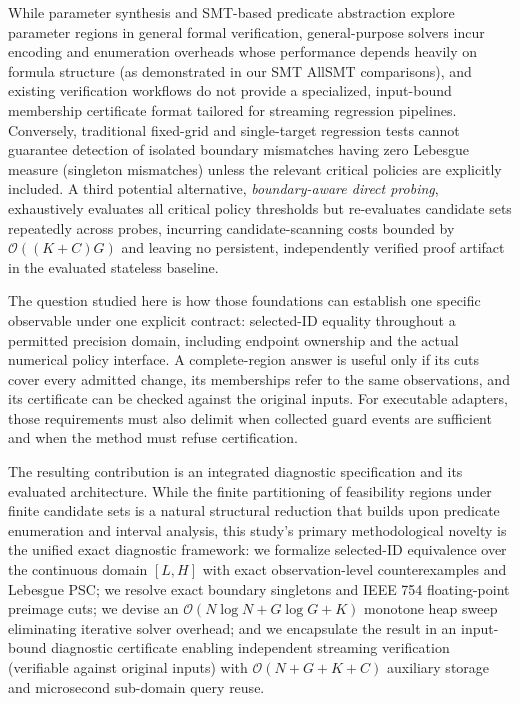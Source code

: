 \documentclass[11pt,a4paper]{article}
\begin{document}
While parameter synthesis and SMT-based predicate abstraction explore parameter regions in general formal verification, general-purpose solvers incur encoding and enumeration overheads whose performance depends heavily on formula structure (as demonstrated in our SMT AllSMT comparisons), and existing verification workflows do not provide a specialized, input-bound membership certificate format tailored for streaming regression pipelines. Conversely, traditional fixed-grid and single-target regression tests cannot guarantee detection of isolated boundary mismatches having zero Lebesgue measure (singleton mismatches) unless the relevant critical policies are explicitly included. A third potential alternative, \textit{boundary-aware direct probing}, exhaustively evaluates all critical policy thresholds but re-evaluates candidate sets repeatedly across probes, incurring candidate-scanning costs bounded by $\mathcal{O}((K+C)G)$ and leaving no persistent, independently verified proof artifact in the evaluated stateless baseline.

The question studied here is how those foundations can establish one specific observable under one explicit contract: selected-ID equality throughout a permitted precision domain, including endpoint ownership and the actual numerical policy interface. A complete-region answer is useful only if its cuts cover every admitted change, its memberships refer to the same observations, and its certificate can be checked against the original inputs. For executable adapters, those requirements must also delimit when collected guard events are sufficient and when the method must refuse certification.

The resulting contribution is an integrated diagnostic specification and its evaluated architecture. While the finite partitioning of feasibility regions under finite candidate sets is a natural structural reduction that builds upon predicate enumeration and interval analysis, this study's primary methodological novelty is the unified exact diagnostic framework: we formalize selected-ID equivalence over the continuous domain $[L, H]$ with exact observation-level counterexamples and Lebesgue PSC; we resolve exact boundary singletons and IEEE 754 floating-point preimage cuts; we devise an $\mathcal{O}(N \log N + G \log G + K)$ monotone heap sweep eliminating iterative solver overhead; and we encapsulate the result in an input-bound diagnostic certificate enabling independent streaming verification (verifiable against original inputs) with $\mathcal{O}(N+G+K+C)$ auxiliary storage and microsecond sub-domain query reuse.
\end{document}
